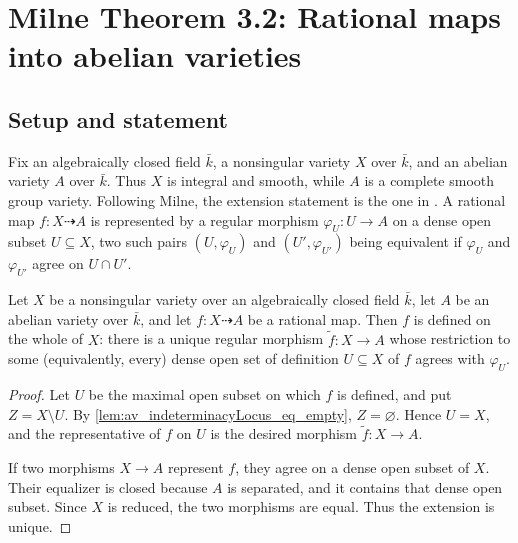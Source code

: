 \chapter{Milne Theorem 3.2: Rational maps into abelian varieties}
\label{chap:Albanese_Thm32RationalMapExtension}

\section{Setup and statement}
\label{sec:thm32_setup}

Fix an algebraically closed field \(\bar k\), a nonsingular variety \(X\) over
\(\bar k\), and an abelian variety \(A\) over \(\bar k\).  Thus \(X\) is
integral and smooth, while \(A\) is a complete smooth group variety.  Following
Milne, the extension statement is the one in \cite{milne-av}.  A
rational map \(f \colon X \dashrightarrow A\) is represented by a regular
morphism \(\varphi_U \colon U \to A\) on a dense open subset
\(U \subseteq X\), two such pairs \((U, \varphi_U)\) and \((U', \varphi_{U'})\) being equivalent
if \(\varphi_U\) and \(\varphi_{U'}\) agree on \(U \cap U'\).

\begin{theorem}\leanok
  \label{thm:rational_map_to_av_extends}

  Let \(X\) be a nonsingular variety over an algebraically closed field \(\bar k\), let \(A\) be
  an abelian variety over \(\bar k\), and let \(f \colon X \dashrightarrow A\) be a rational
  map. Then \(f\) is defined on the whole of \(X\): there is a unique regular morphism
  \(\widetilde f \colon X \to A\) whose restriction to some (equivalently, every) dense open
  set of definition \(U \subseteq X\) of \(f\) agrees with \(\varphi_U\).
\end{theorem}

\begin{proof}
  Let \(U\) be the maximal open subset on which \(f\) is defined, and put
  \(Z=X\setminus U\).  By \cref{lem:av_indeterminacyLocus_eq_empty},
  \(Z=\varnothing\).  Hence \(U=X\), and the representative of \(f\) on
  \(U\) is the desired morphism \(\widetilde f\colon X\to A\).

  If two morphisms \(X\to A\) represent \(f\), they agree on a dense open
  subset of \(X\).  Their equalizer is closed because \(A\) is separated,
  and it contains that dense open subset.  Since \(X\) is reduced, the two
  morphisms are equal.  Thus the extension is unique.
\end{proof}

